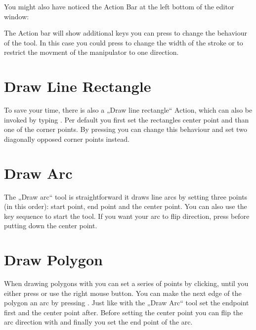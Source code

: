 \documentclass[letterpaper,10pt,czech]{sphinxmanual}
\begin{document}
You might also have noticed the Action Bar at the left bottom of the editor window:

\noindent{}

The Action bar will show additional keys you can press to change the behaviour of the tool. In this case you could press  to change the width of the stroke or \sphinxcode{\sphinxupquote{/}} to restrict the movment of the manipulator to one direction.


\section{Draw Line Rectangle}
\label{\detokenize{drawing:draw-line-rectangle}}
\noindent{}

To save your time, there is also a „Draw line rectangle“ Action, which can also be invoked by typing . Per default you first set the rectangles center point and than one of the corner points. By pressing  you can change this behaviour and set two diagonally opposed corner points instead.


\section{Draw Arc}
\label{\detokenize{drawing:draw-arc}}
\noindent{}

The „Draw arc“ tool is straightforward it draws line arcs by setting three points (in this order): start point, end point and the center point. You can also use the key sequence  to start the tool. If you want your arc to flip direction, press  before putting down the center point.


\section{Draw Polygon}
\label{\detokenize{drawing:draw-polygon}}
\noindent{}

When drawing polygons with  you can set a series of points by clicking, until you either press  or use the right mouse button. You can make the next edge of the polygon an arc by pressing . Just like with the „Draw Arc“ tool set the endpoint first and the center point after. Before setting the center point you can flip the arc direction with  and finally you set the end point of the arc.
\end{document}
